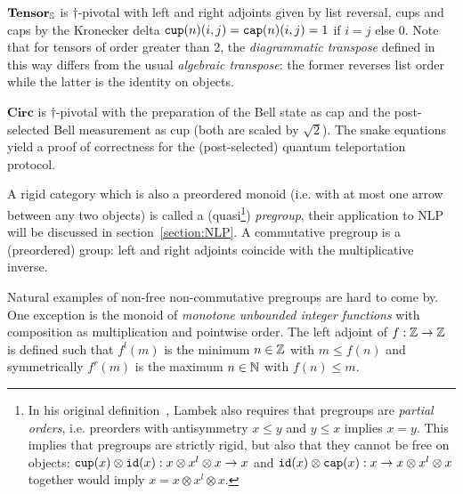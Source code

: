 \begin{example}
$\mathbf{Tensor}_\S$ is $\dagger$-pivotal with left and right adjoints given by list reversal, cups and caps by the Kronecker delta $\ttcup(n)(i, j) = \ttcap(n)(i, j) = 1$ if $i = j$ else $0$.
Note that for tensors of order greater than 2, the \emph{diagrammatic transpose} defined in this way differs from the usual \emph{algebraic transpose}: the former reverses list order while the latter is the identity on objects.
\end{example}

\begin{example}
$\mathbf{Circ}$ is $\dagger$-pivotal with the preparation of the Bell state as cap and the post-selected Bell measurement as cup (both are scaled by $\sqrt{2}$).
The snake equations yield a proof of correctness for the (post-selected) quantum teleportation protocol.
\end{example}

\begin{example}
A rigid category which is also a preordered monoid (i.e. with at most one arrow between any two objects) is called a (quasi\footnote
{In his original definition~\cite{Lambek99}, Lambek also requires that pregroups are \emph{partial orders}, i.e. preorders with antisymmetry $x \leq y$ and $y \leq x$ implies $x = y$.
This implies that pregroups are strictly rigid, but also that they cannot be free on objects: $\ttcup(x) \otimes \id(x) : x \otimes x^l \otimes x \to x$ and $\id(x) \otimes \ttcap(x) : x \to x \otimes x^l \otimes x$ together would imply $x = x \otimes x^l \otimes x$.
}) \emph{pregroup}, their application to NLP will be discussed in section~\ref{section:NLP}.
A commutative pregroup is a (preordered) group: left and right adjoints coincide with the multiplicative inverse.

Natural examples of non-free non-commutative pregroups are hard to come by.
One exception is the monoid of \emph{monotone unbounded integer functions} with composition as multiplication and pointwise order.
The left adjoint of $f : \Z \to \Z$ is defined such that $f^l(m)$ is the minimum $n \in \Z$ with $m \leq f(n)$ and symmetrically $f^r(m)$ is the maximum $n \in \N$ with $f(n) \leq m$.
\end{example}

